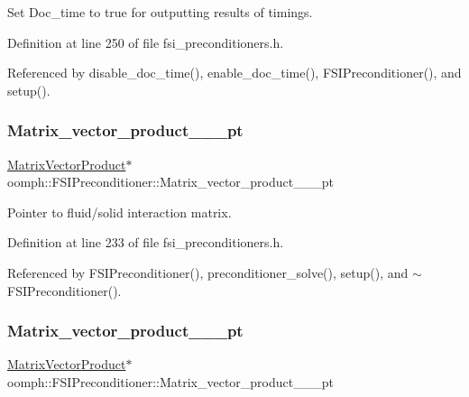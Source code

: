 Set Doc\+\_\+time to true for outputting results of timings. 



Definition at line 250 of file fsi\+\_\+preconditioners.\+h.



Referenced by disable\+\_\+doc\+\_\+time(), enable\+\_\+doc\+\_\+time(), F\+S\+I\+Preconditioner(), and setup().

\mbox{\label{classoomph_1_1FSIPreconditioner_a595acfea83abd9fd907c208f3b487f57}} 
\subsubsection{\texorpdfstring{Matrix\+\_\+vector\+\_\+product\+\_\+\_\+\_\+pt}{Matrix\_vector\_product\_0\_1\_pt}}
{\footnotesize\ttfamily \hyperlink{classoomph_1_1MatrixVectorProduct}{Matrix\+Vector\+Product}$\ast$ oomph\+::\+F\+S\+I\+Preconditioner\+::\+Matrix\+\_\+vector\+\_\+product\+\_\+\_\+\_\+pt\hspace{0.3cm}{\ttfamily [private]}}



Pointer to fluid/solid interaction matrix. 



Definition at line 233 of file fsi\+\_\+preconditioners.\+h.



Referenced by F\+S\+I\+Preconditioner(), preconditioner\+\_\+solve(), setup(), and $\sim$\+F\+S\+I\+Preconditioner().

\mbox{\label{classoomph_1_1FSIPreconditioner_a8b4161c521cb4160ae07bb0096eaca1c}} 
\subsubsection{\texorpdfstring{Matrix\+\_\+vector\+\_\+product\+\_\+\_\+\_\+pt}{Matrix\_vector\_product\_1\_0\_pt}}
{\footnotesize\ttfamily \hyperlink{classoomph_1_1MatrixVectorProduct}{Matrix\+Vector\+Product}$\ast$ oomph\+::\+F\+S\+I\+Preconditioner\+::\+Matrix\+\_\+vector\+\_\+product\+\_\+\_\+\_\+pt\hspace{0.3cm}{\ttfamily [private]}}



